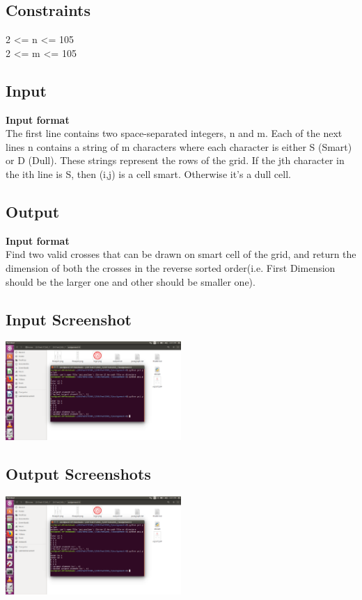 \documentclass[12pt]{article}
\begin{document}
\subsection{Constraints}
{

2 <= n <= 105\\
2 <= m <= 105
}
\subsection{Input}
{

\textbf{Input format} \\
The first line contains two space-separated integers,  n and m. 
Each of the next  lines n contains a string of  m characters where each character is either S (Smart) or D (Dull). These strings represent the rows of the grid. If the jth character in the ith  line is S, then  (i,j) is a  cell smart. Otherwise it's a  dull cell.
}
\subsection{Output}
{
\textbf{Input format} \\
Find two valid crosses that can be drawn on smart cell of the grid, and return the dimension of both the crosses in the reverse sorted order(i.e. First Dimension should be the larger one and other should be smaller one).\\
}
\subsection{Input Screenshot}
\includegraphics[width=0.5\textwidth]{ps1screenshot.png}

\subsection{Output Screenshots}
\includegraphics[width=0.5\textwidth]{ps1screenshot.png}
{
\begin{center}
    
\end{center}    
}
\end{document}
